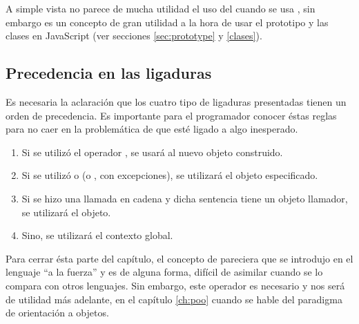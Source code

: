 A simple vista no parece de mucha utilidad el uso del  cuando se usa , sin embargo es un concepto de gran utilidad a la hora de usar el prototipo y las clases en JavaScript (ver secciones \ref{sec:prototype} y \ref{clases}).

\subsection{Precedencia en las ligaduras}

Es necesaria la aclaración que los cuatro tipo de ligaduras presentadas tienen un orden de precedencia. Es importante para el programador conocer éstas reglas para no caer en la problemática de que  esté ligado a algo inesperado.

\begin{enumerate}
\item Si se utilizó el operador , se usará al nuevo objeto construido.
\item Si se utilizó  o  (o , con excepciones), se utilizará el objeto especificado.
\item Si se hizo una llamada en cadena y dicha sentencia tiene un objeto llamador, se utilizará el objeto.
\item Sino, se utilizará el contexto global.
\end{enumerate}

Para cerrar ésta parte del capítulo, el concepto de  pareciera que se introdujo en el lenguaje "`a la fuerza"' y es de alguna forma, difícil de asimilar cuando se lo compara con otros lenguajes. Sin embargo, este operador es necesario y nos será de utilidad más adelante, en el capítulo \ref{ch:poo} cuando se hable del paradigma de orientación a objetos.